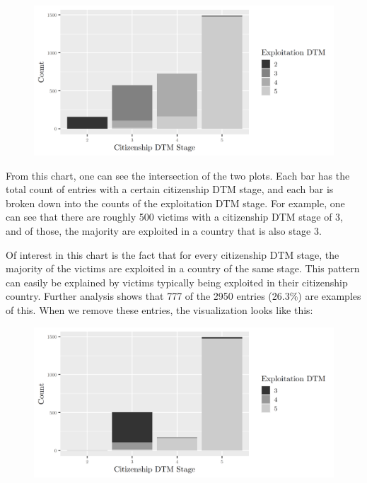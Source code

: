\documentclass{article} %
\begin{document}
\FloatBarrier
\begin{figure}[H]
	\includegraphics[width = \textwidth]{DTMStage1}
\end{figure}
\FloatBarrier

From this chart, one can see the intersection of the two plots. Each bar has the total count of entries with a certain citizenship DTM stage, and each bar is broken down into the counts of the exploitation DTM stage. For example, one can see that there are roughly 500 victims with a citizenship DTM stage of 3, and of those, the majority are exploited in a country that is also stage 3.

Of interest in this chart is the fact that for every citizenship DTM stage, the majority of the victims are exploited in a country of the same stage. This pattern can easily be explained by victims typically being exploited in their citizenship country. Further analysis shows that 777 of the 2950 entries (26.3\%) are examples of this. When we remove these entries, the visualization looks like this:

\FloatBarrier
\begin{figure}[H]
	\includegraphics[width = \textwidth]{Different_CountryDTM}
\end{figure}
\FloatBarrier
\end{document}
